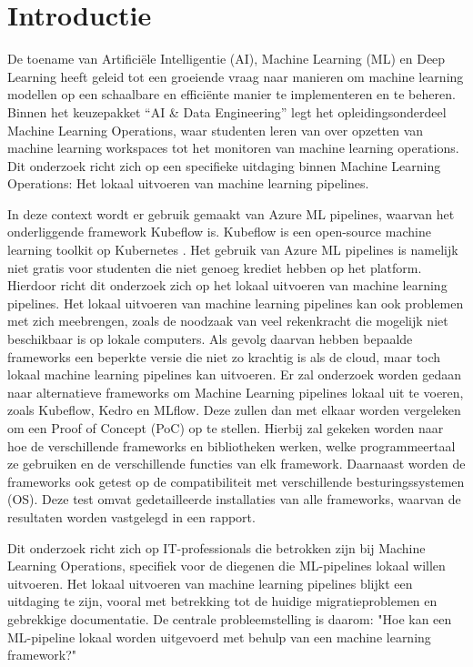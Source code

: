 
\section{Introductie}%
\label{sec:introductie}

De toename van Artificiële Intelligentie (AI), Machine Learning (ML) en Deep Learning heeft geleid tot een groeiende vraag naar manieren om machine learning modellen op een schaalbare en efficiënte manier te implementeren en te beheren.
Binnen het keuzepakket ``AI \& Data Engineering'' legt het opleidingsonderdeel Machine Learning Operations, waar studenten leren van over opzetten van machine learning workspaces tot het monitoren van machine learning operations.
Dit onderzoek richt zich op een specifieke uitdaging binnen Machine Learning Operations: Het lokaal uitvoeren van machine learning pipelines.\newline

In deze context wordt er gebruik gemaakt van Azure ML pipelines, waarvan het onderliggende framework Kubeflow is. Kubeflow is een open-source machine learning toolkit op Kubernetes \autocite{Kubeflow2021}.
Het gebruik van Azure ML pipelines is namelijk niet gratis voor studenten die niet genoeg krediet hebben op het platform. Hierdoor richt dit onderzoek zich op het lokaal uitvoeren van machine learning pipelines.
Het lokaal uitvoeren van machine learning pipelines kan ook problemen met zich meebrengen, zoals de noodzaak van veel rekenkracht die mogelijk niet beschikbaar is op lokale computers. Als gevolg daarvan hebben bepaalde frameworks een beperkte versie die niet zo krachtig is als de cloud, maar toch lokaal machine learning pipelines kan uitvoeren.
Er zal onderzoek worden gedaan naar alternatieve frameworks om Machine Learning pipelines lokaal uit te voeren, zoals Kubeflow, Kedro en MLflow. Deze zullen dan met elkaar worden vergeleken om een Proof of Concept (PoC) op te stellen. Hierbij zal gekeken worden naar hoe de verschillende frameworks en bibliotheken werken, welke programmeertaal ze gebruiken en de verschillende functies van elk framework.
Daarnaast worden de frameworks ook getest op de compatibiliteit met verschillende besturingssystemen (OS). Deze test omvat gedetailleerde installaties van alle frameworks, waarvan de resultaten worden vastgelegd in een rapport.\newline

Dit onderzoek richt zich op IT-professionals die betrokken zijn bij Machine Learning Operations, specifiek voor de diegenen die ML-pipelines lokaal willen uitvoeren.
Het lokaal uitvoeren van machine learning pipelines blijkt een uitdaging te zijn, vooral met betrekking tot de huidige migratieproblemen en gebrekkige documentatie.
De centrale probleemstelling is daarom: "Hoe kan een ML-pipeline lokaal worden uitgevoerd met behulp van een machine learning framework?"

